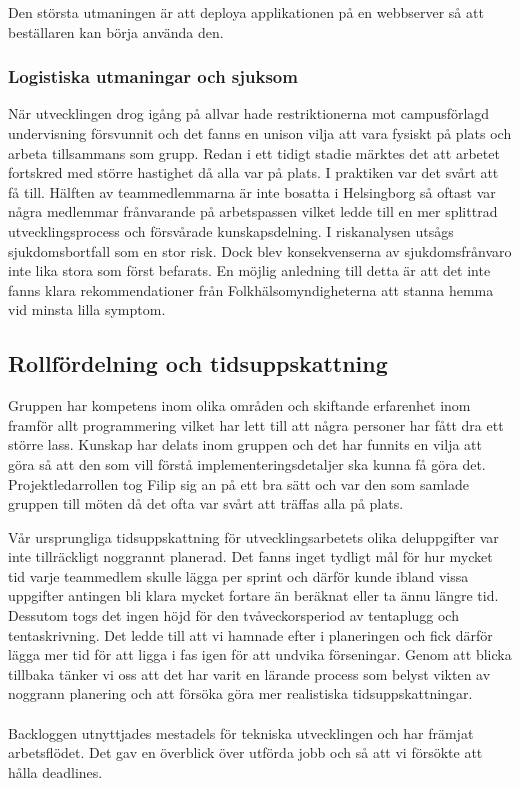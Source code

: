 \documentclass[12pt]{article}
\begin{document}
Den största utmaningen är att deploya applikationen på en webbserver så att beställaren kan börja använda den. 

\subsubsection{Logistiska utmaningar och sjuksom}

När utvecklingen drog igång på allvar hade restriktionerna mot campusförlagd undervisning försvunnit och det fanns en unison vilja att vara fysiskt på plats och arbeta tillsammans som grupp. Redan i ett tidigt stadie märktes det att arbetet fortskred med större hastighet då alla var på plats. I praktiken var det svårt att få till. Hälften av teammedlemmarna är inte bosatta i Helsingborg så oftast var några medlemmar frånvarande på arbetspassen vilket ledde till en mer splittrad utvecklingsprocess och försvårade kunskapsdelning. I riskanalysen utsågs sjukdomsbortfall som en stor risk. Dock blev konsekvenserna av sjukdomsfrånvaro inte lika stora som först befarats. En möjlig anledning till detta är att det inte fanns klara rekommendationer från Folkhälsomyndigheterna att stanna hemma vid minsta lilla symptom.

\subsection{Rollfördelning och tidsuppskattning}

Gruppen har kompetens inom olika områden och skiftande erfarenhet inom framför allt programmering vilket har lett till att några personer har fått dra ett större lass. Kunskap har delats inom gruppen och det har funnits en vilja att göra så att den som vill förstå implementeringsdetaljer ska kunna få göra det. Projektledarrollen tog Filip sig an på ett bra sätt och var den som samlade gruppen till möten då det ofta var svårt att träffas alla på plats. 

Vår ursprungliga tidsuppskattning för utvecklingsarbetets olika deluppgifter var inte tillräckligt noggrannt planerad. Det fanns inget tydligt mål för hur mycket tid varje teammedlem skulle lägga per sprint och därför kunde ibland vissa uppgifter antingen bli klara mycket fortare än beräknat eller ta ännu längre tid. Dessutom togs det ingen höjd för den tvåveckorsperiod av tentaplugg och tentaskrivning. Det ledde till att vi hamnade efter i planeringen och fick därför lägga mer tid för att ligga i fas igen för att undvika förseningar. Genom att blicka tillbaka tänker vi oss att det har varit en lärande process som belyst vikten av noggrann planering och att försöka göra mer realistiska tidsuppskattningar. \\\\
Backloggen utnyttjades mestadels för tekniska utvecklingen och har främjat arbetsflödet. Det gav en överblick över utförda jobb och så att vi försökte att hålla deadlines.\\\
\end{document}
